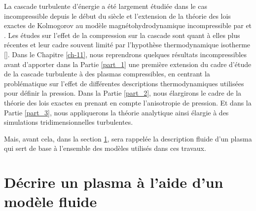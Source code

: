 La cascade turbulente d'énergie a été largement étudiée dans le cas incompressible depuis le début du siècle et l'extension de la théorie des lois exactes de Kolmogorov au modèle magnétohydrodynamique incompressible par \cite{politano_von_1998} et \cite{politano_dynamical_1998}. Les études sur l'effet de la compression sur la cascade sont quant à elles plus récentes et leur cadre souvent limité par l'hypothèse thermodynamique isotherme [\cite{marino_scaling_2023}]. Dans le Chapitre \ref{ch-11}, nous reprendrons quelques résultats incompressibles avant d'apporter dans la Partie \ref{part_1} une première extension du cadre d'étude de la cascade turbulente à des plasmas compressibles, en centrant la problématique sur l'effet de différentes descriptions thermodynamiques utilisées pour définir la pression. Dans la Partie \ref{part_2}, nous élargirons le cadre de la théorie des lois exactes en prenant en compte l'anisotropie de pression. Et dans la Partie \ref{part_3}, nous appliquerons la théorie analytique ainsi élargie à des simulations tridimensionnelles turbulentes. 

Mais, avant cela, dans la section \ref{sec-023}, sera rappelée la description fluide d'un plasma qui sert de base à l'ensemble des modèles utilisés dans ces travaux. 

\section{Décrire un plasma à l'aide d'un modèle fluide} \label{sec-023}

